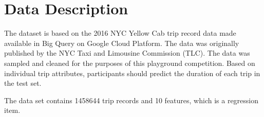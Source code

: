 \documentclass{amsart}
\begin{document}





\section{Data Description} \label{sec-preliminaries}

The  dataset is based on the 2016 NYC Yellow Cab trip record data made available in Big Query on Google Cloud Platform. The data was originally published by the NYC Taxi and Limousine Commission (TLC). The data was sampled and cleaned for the purposes of this playground competition. Based on individual trip attributes, participants should predict the duration of each trip in the test set.

The data set contains 1458644 trip records and 10 features, which is a regression item.
\end{document}
